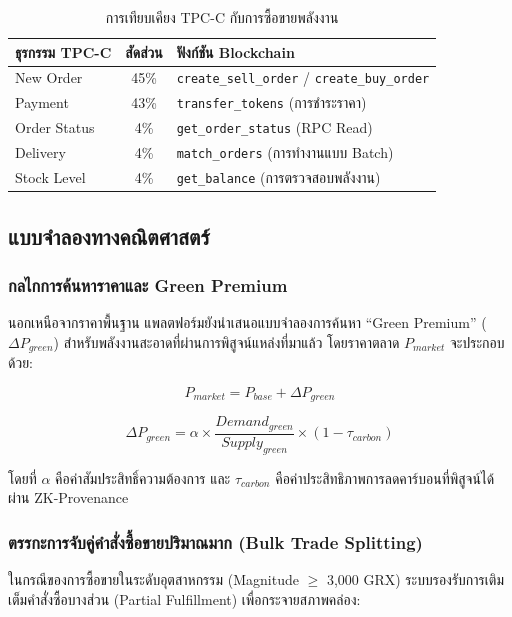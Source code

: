 \documentclass[conference,10pt]{IEEEtran}
\begin{document}
\begin{table}[t!]
\caption{การเทียบเคียง TPC-C กับการซื้อขายพลังงาน}
\begin{center}
\begin{tabular}{lcl}
\toprule
\textbf{ธุรกรรม TPC-C} & \textbf{สัดส่วน} & \textbf{ฟังก์ชัน Blockchain} \\
\midrule
New Order & 45\% & \texttt{create\_sell\_order} / \texttt{create\_buy\_order} \\
Payment & 43\% & \texttt{transfer\_tokens} (การชำระราคา) \\
Order Status & 4\% & \texttt{get\_order\_status} (RPC Read) \\
Delivery & 4\% & \texttt{match\_orders} (การทำงานแบบ Batch) \\
Stock Level & 4\% & \texttt{get\_balance} (การตรวจสอบพลังงาน) \\
\bottomrule
\end{tabular}
\label{tab:tpcc-mapping}
\end{center}
\end{table}

\subsection{แบบจำลองทางคณิตศาสตร์}

\subsubsection{กลไกการค้นหาราคาและ Green Premium}
นอกเหนือจากราคาพื้นฐาน แพลตฟอร์มยังนำเสนอแบบจำลองการค้นหา ``Green Premium'' ($\Delta P_{green}$) สำหรับพลังงานสะอาดที่ผ่านการพิสูจน์แหล่งที่มาแล้ว โดยราคาตลาด $P_{market}$ จะประกอบด้วย:

\begin{equation}
P_{market} = P_{base} + \Delta P_{green}
\end{equation}

\begin{equation}
\Delta P_{green} = \alpha \times \frac{Demand_{green}}{Supply_{green}} \times (1 - \tau_{carbon})
\end{equation}

โดยที่ $\alpha$ คือค่าสัมประสิทธิ์ความต้องการ และ $\tau_{carbon}$ คือค่าประสิทธิภาพการลดคาร์บอนที่พิสูจน์ได้ผ่าน ZK-Provenance

\subsubsection{ตรรกะการจับคู่คำสั่งซื้อขายปริมาณมาก (Bulk Trade Splitting)}
ในกรณีของการซื้อขายในระดับอุตสาหกรรม (Magnitude $\ge$ 3,000 GRX) ระบบรองรับการเติมเต็มคำสั่งซื้อบางส่วน (Partial Fulfillment) เพื่อกระจายสภาพคล่อง:
\end{document}
